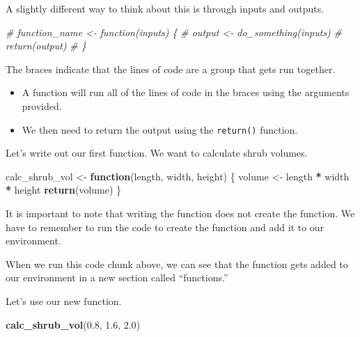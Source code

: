 \documentclass[
]{article}
\newenvironment{Shaded}{\begin{snugshade}}{\end{snugshade}}
\newcommand{\CommentTok}[1]{\textcolor[rgb]{0.56,0.35,0.01}{\textit{#1}}}
\newcommand{\ControlFlowTok}[1]{\textcolor[rgb]{0.13,0.29,0.53}{\textbf{#1}}}
\newcommand{\FloatTok}[1]{\textcolor[rgb]{0.00,0.00,0.81}{#1}}
\newcommand{\FunctionTok}[1]{\textcolor[rgb]{0.13,0.29,0.53}{\textbf{#1}}}
\newcommand{\NormalTok}[1]{#1}
\newcommand{\OtherTok}[1]{\textcolor[rgb]{0.56,0.35,0.01}{#1}}
\newcommand{\SpecialCharTok}[1]{\textcolor[rgb]{0.81,0.36,0.00}{\textbf{#1}}}
\providecommand{\tightlist}{%
  \setlength{\itemsep}{0pt}\setlength{\parskip}{0pt}}
\begin{document}
A slightly different way to think about this is through inputs and
outputs.

\begin{Shaded}
\begin{Highlighting}[]
\CommentTok{\# function\_name \textless{}{-} function(inputs) \{}
\CommentTok{\#   output \textless{}{-} do\_something(inputs)}
\CommentTok{\#   return(output)}
\CommentTok{\# \}}
\end{Highlighting}
\end{Shaded}

The braces indicate that the lines of code are a group that gets run
together.

\begin{itemize}
\tightlist
\item
  A function will run all of the lines of code in the braces using the
  arguments provided.
\item
  We then need to return the output using the \texttt{return()}
  function.
\end{itemize}

Let's write out our first function. We want to calculate shrub volumes.

\begin{Shaded}
\begin{Highlighting}[]
\NormalTok{calc\_shrub\_vol }\OtherTok{\textless{}{-}} \ControlFlowTok{function}\NormalTok{(length, width, height) \{}
\NormalTok{  volume }\OtherTok{\textless{}{-}}\NormalTok{ length }\SpecialCharTok{*}\NormalTok{ width }\SpecialCharTok{*}\NormalTok{ height}
  \FunctionTok{return}\NormalTok{(volume)}
\NormalTok{\}}
\end{Highlighting}
\end{Shaded}

It is important to note that writing the function does not create the
function. We have to remember to run the code to create the function and
add it to our environment.

When we run this code chunk above, we can see that the function gets
added to our environment in a new section called ``functions.''

Let's use our new function.

\begin{Shaded}
\begin{Highlighting}[]
\FunctionTok{calc\_shrub\_vol}\NormalTok{(}\FloatTok{0.8}\NormalTok{, }\FloatTok{1.6}\NormalTok{, }\FloatTok{2.0}\NormalTok{)}
\end{Highlighting}
\end{Shaded}
\end{document}
